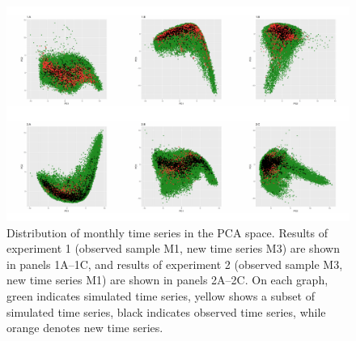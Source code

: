 \documentclass[11pt,a4paper,]{article}
\theoremstyle{definition}
\theoremstyle{definition}
\theoremstyle{definition}
\theoremstyle{remark}
\begin{document}
\begin{figure}

{\centering \includegraphics[width=\textwidth]{figure/pca3-1} 

}

\caption{Distribution of monthly time series in the PCA space. Results of experiment 1 (observed sample M1, new time series M3) are shown in panels 1A--1C, and results of experiment 2 (observed sample M3, new time series M1) are shown in panels 2A--2C. On each graph, green indicates simulated time series, yellow shows a subset of simulated time series, black indicates observed time series, while orange denotes new time series.}\label{fig:pca3}
\end{figure}
\end{document}
